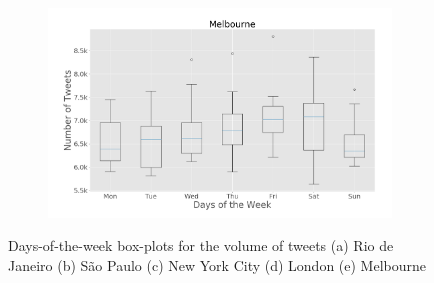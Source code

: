 \begin{figure}[h]
     \begin{subfigure}[t]{0.45\textwidth}
        \centering
        \includegraphics[width=1\linewidth]{figures/melbourne_box_plt_day_of_week.png}
        \caption{}
        \label{fig:melbourne_box_plot_day_of_week}
    \end{subfigure}
    
\caption[Five numerical solutions]{Days-of-the-week box-plots for the volume of tweets (a) Rio de Janeiro (b) São Paulo (c) New York City (d) London (e) Melbourne}
\end{figure}

